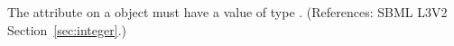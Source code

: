 The attribute  on a \Unit object must have a value of type
.  (References: SBML L3V2 Section~\ref{sec:integer}.)
